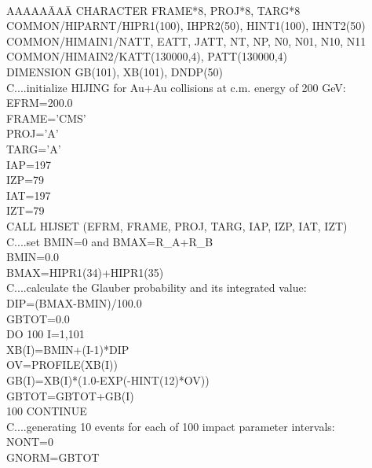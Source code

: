 {\tt
\begin{tabbing}
AAAAA\=AAA\=  \kill
        \> \>CHARACTER FRAME*8, PROJ*8, TARG*8 \\
        \> \>COMMON/HIPARNT/HIPR1(100), IHPR2(50), HINT1(100), IHNT2(50) \\
        \> \>COMMON/HIMAIN1/NATT, EATT, JATT, NT, NP, N0, N01, N10, N11 \\
        \> \>COMMON/HIMAIN2/KATT(130000,4), PATT(130000,4) \\
        \> \>DIMENSION GB(101), XB(101), DNDP(50) \\
C....initialize HIJING for Au+Au collisions at c.m. energy of 200 GeV: \> \>\\
\>\>    EFRM=200.0 \\
\>\>    FRAME='CMS' \\
\>\>    PROJ='A' \\
\>\>    TARG='A' \\
\>\>    IAP=197 \\
\>\>    IZP=79 \\
\>\>    IAT=197 \\
\>\>    IZT=79 \\
\>\>    CALL HIJSET (EFRM, FRAME, PROJ, TARG, IAP, IZP, IAT, IZT) \\
C....set BMIN=0 and BMAX=R\_A+R\_B \>\> \\
\>\>    BMIN=0.0 \\
\>\>    BMAX=HIPR1(34)+HIPR1(35) \\
C....calculate the Glauber probability and its integrated value:\>\> \\
\>\>    DIP=(BMAX-BMIN)/100.0 \\
\>\>    GBTOT=0.0 \\
\>\>    DO 100 I=1,101 \\
\>\>    \hspace{24pt}XB(I)=BMIN+(I-1)*DIP \\
\>\>    \hspace{24pt}OV=PROFILE(XB(I)) \\
\>\>    \hspace{24pt}GB(I)=XB(I)*(1.0-EXP(-HINT(12)*OV)) \\
\>\>    \hspace{24pt}GBTOT=GBTOT+GB(I) \\
100\>\> CONTINUE \\
C....generating 10 events for each of 100 impact parameter intervals:\>\> \\
\>\>    NONT=0 \\
\>\>    GNORM=GBTOT \\

\end{tabbing}}
